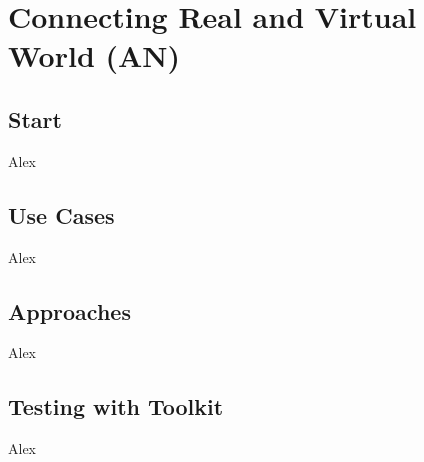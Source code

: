 \chapter{Connecting Real and Virtual World (AN)}
\label{cha:Connecting Real and Virtual World}



\section{Start}

Alex

\section{Use Cases}

Alex

\section{Approaches}

Alex

\section{Testing with Toolkit}

Alex